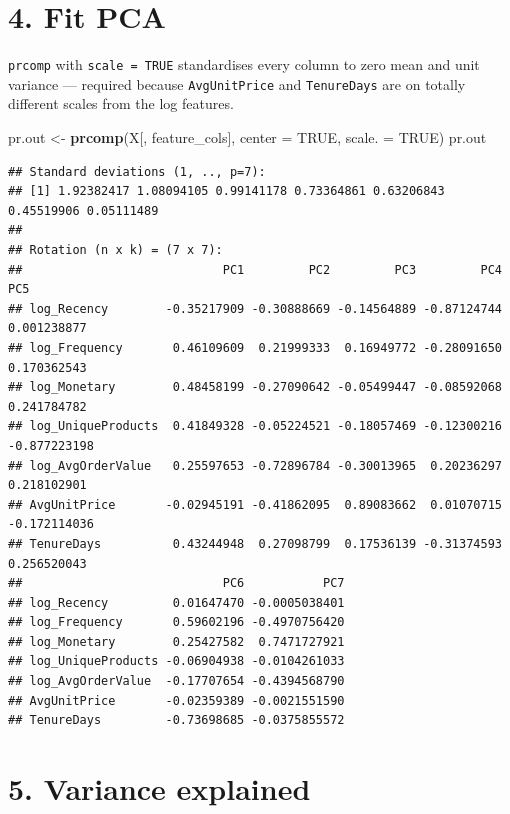 \documentclass[
]{article}
\newenvironment{Shaded}{\begin{snugshade}}{\end{snugshade}}
\newcommand{\AttributeTok}[1]{\textcolor[rgb]{0.13,0.29,0.53}{#1}}
\newcommand{\ConstantTok}[1]{\textcolor[rgb]{0.56,0.35,0.01}{#1}}
\newcommand{\FunctionTok}[1]{\textcolor[rgb]{0.13,0.29,0.53}{\textbf{#1}}}
\newcommand{\NormalTok}[1]{#1}
\newcommand{\OtherTok}[1]{\textcolor[rgb]{0.56,0.35,0.01}{#1}}
\begin{document}
\section{4. Fit PCA}\label{fit-pca}

\texttt{prcomp} with \texttt{scale\ =\ TRUE} standardises every column
to zero mean and unit variance --- required because
\texttt{AvgUnitPrice} and \texttt{TenureDays} are on totally different
scales from the log features.

\begin{Shaded}
\begin{Highlighting}[]
\NormalTok{pr.out }\OtherTok{\textless{}{-}} \FunctionTok{prcomp}\NormalTok{(X[, feature\_cols], }\AttributeTok{center =} \ConstantTok{TRUE}\NormalTok{, }\AttributeTok{scale. =} \ConstantTok{TRUE}\NormalTok{)}
\NormalTok{pr.out}
\end{Highlighting}
\end{Shaded}

\begin{verbatim}
## Standard deviations (1, .., p=7):
## [1] 1.92382417 1.08094105 0.99141178 0.73364861 0.63206843 0.45519906 0.05111489
## 
## Rotation (n x k) = (7 x 7):
##                            PC1         PC2         PC3         PC4          PC5
## log_Recency        -0.35217909 -0.30888669 -0.14564889 -0.87124744  0.001238877
## log_Frequency       0.46109609  0.21999333  0.16949772 -0.28091650  0.170362543
## log_Monetary        0.48458199 -0.27090642 -0.05499447 -0.08592068  0.241784782
## log_UniqueProducts  0.41849328 -0.05224521 -0.18057469 -0.12300216 -0.877223198
## log_AvgOrderValue   0.25597653 -0.72896784 -0.30013965  0.20236297  0.218102901
## AvgUnitPrice       -0.02945191 -0.41862095  0.89083662  0.01070715 -0.172114036
## TenureDays          0.43244948  0.27098799  0.17536139 -0.31374593  0.256520043
##                            PC6           PC7
## log_Recency         0.01647470 -0.0005038401
## log_Frequency       0.59602196 -0.4970756420
## log_Monetary        0.25427582  0.7471727921
## log_UniqueProducts -0.06904938 -0.0104261033
## log_AvgOrderValue  -0.17707654 -0.4394568790
## AvgUnitPrice       -0.02359389 -0.0021551590
## TenureDays         -0.73698685 -0.0375855572
\end{verbatim}

\section{5. Variance explained}\label{variance-explained}
\end{document}
